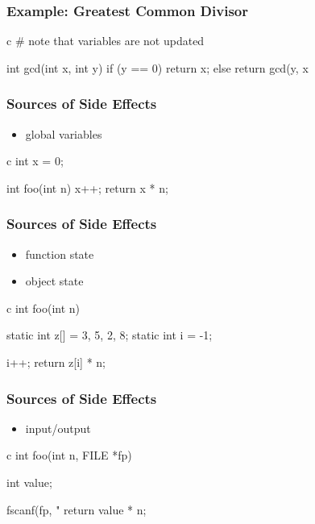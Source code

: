 \documentclass[dvipsnames]{beamer}
\theoremstyle{plain}
\begin{document}
\begin{frame}[fragile]
  \frametitle{Example: Greatest Common Divisor}

  \begin{example}
    \begin{pygments}[]{c}
# note that variables are not updated

int gcd(int x, int y)
{
    if (y == 0)
        return x;
    else
        return gcd(y, x %
}
    \end{pygments}
  \end{example}
\end{frame}

\begin{frame}[fragile]
  \frametitle{Sources of Side Effects}

  \begin{itemize}
    \item global variables
  \end{itemize}

  \begin{example}
    \begin{pygments}[]{c}
int x = 0;

int foo(int n)
{
    x++;
    return x * n;
}
    \end{pygments}
  \end{example}
\end{frame}

\begin{frame}[fragile]
  \frametitle{Sources of Side Effects}

  \begin{itemize}
    \item function state
    \item object state
  \end{itemize}

  \begin{example}
    \begin{pygments}[]{c}
int foo(int n)
{
    static int z[] = {3, 5, 2, 8};
    static int i = -1;

    i++;
    return z[i] * n;
}
    \end{pygments}
  \end{example}
\end{frame}

\begin{frame}[fragile]
  \frametitle{Sources of Side Effects}

  \begin{itemize}
    \item input/output
  \end{itemize}

  \begin{example}
    \begin{pygments}[]{c}
int foo(int n, FILE *fp)
{
    int value;

    fscanf(fp, "%
    return value * n;
}
    \end{pygments}
  \end{example}
\end{frame}
\end{document}
